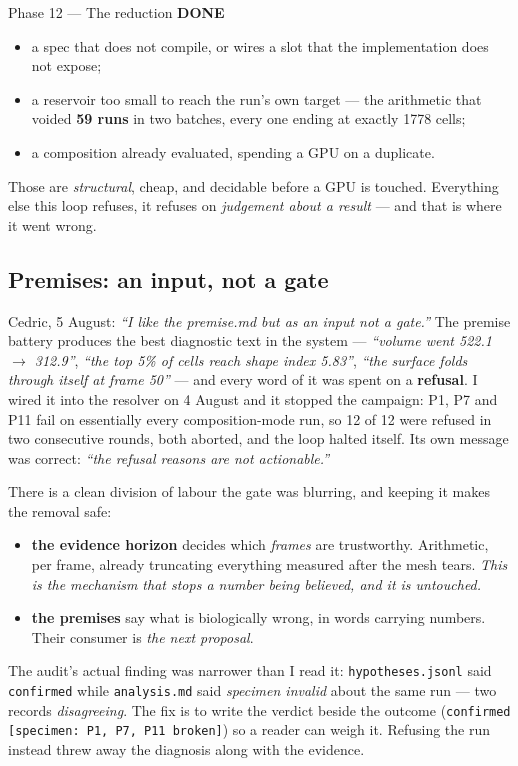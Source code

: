 \documentclass[11pt,a4paper]{article}
\newcommand{\code}[1]{\texttt{#1}}
\newcommand{\done}{\textcolor{good}{\textbf{DONE}}}
\begin{document}
\begin{phasebox}{Phase 12 --- The reduction \hfill \done}
\begin{itemize}\itemsep2pt
\item a spec that does not compile, or wires a slot that the implementation does not expose;
\item a reservoir too small to reach the run's own target --- the arithmetic that voided
      \textbf{59 runs} in two batches, every one ending at exactly 1778 cells;
\item a composition already evaluated, spending a GPU on a duplicate.
\end{itemize}

\noindent Those are \emph{structural}, cheap, and decidable before a GPU is touched. Everything else
this loop refuses, it refuses on \emph{judgement about a result} --- and that is where it went wrong.

\subsection*{Premises: an input, not a gate}
Cedric, 5 August: \emph{``I like the premise.md but as an input not a gate.''} The premise battery
produces the best diagnostic text in the system --- \emph{``volume went 522.1 $\to$ 312.9''},
\emph{``the top 5\% of cells reach shape index 5.83''}, \emph{``the surface folds through itself at
frame 50''} --- and every word of it was spent on a \textbf{refusal}. I wired it into the resolver on
4 August and it stopped the campaign: P1, P7 and P11 fail on essentially every composition-mode run,
so 12 of 12 were refused in two consecutive rounds, both aborted, and the loop halted itself. Its own
message was correct: \emph{``the refusal reasons are not actionable.''}

There is a clean division of labour the gate was blurring, and keeping it makes the removal safe:

\begin{itemize}\itemsep2pt
\item \textbf{the evidence horizon} decides which \emph{frames} are trustworthy. Arithmetic, per
      frame, already truncating everything measured after the mesh tears. \emph{This is the
      mechanism that stops a number being believed, and it is untouched.}
\item \textbf{the premises} say what is biologically wrong, in words carrying numbers. Their
      consumer is \emph{the next proposal}.
\end{itemize}

\noindent The audit's actual finding was narrower than I read it: \code{hypotheses.jsonl} said
\code{confirmed} while \code{analysis.md} said \emph{specimen invalid} about the same run --- two
records \emph{disagreeing}. The fix is to write the verdict beside the outcome
(\code{confirmed [specimen: P1, P7, P11 broken]}) so a reader can weigh it. Refusing the run instead
threw away the diagnosis along with the evidence.


\end{phasebox}
\end{document}
